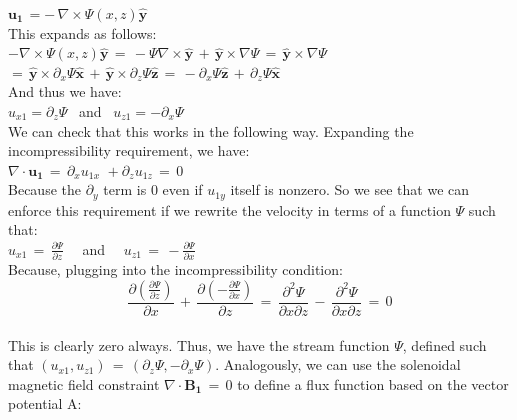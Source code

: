 \documentclass[letterpaper,12pt]{article}
\begin{document}
 $\mathbf{u_1} \, = - \, \nabla \times \Psi\left(x, z\right) \mathbf{\hat{y}}$ \\
 
 This expands as follows: \\
 
 $- \nabla \times \Psi\left(x, z\right) \mathbf{\hat{y}} \, = \, - \Psi\nabla \times \mathbf{\hat{y}} \, + \, \mathbf{\hat{y}} \times \nabla \Psi \, = \, \mathbf{\hat{y}} \times \nabla \Psi \,$ \\
 
 $= \, \mathbf{\hat{y}} \times \partial_x \Psi \mathbf{\hat{x}} \, + \, \mathbf{\hat{y}} \times \partial_z \Psi \mathbf{\hat{z}} \, = \, -\partial_x \Psi \mathbf{\hat{z}} \, + \, \partial_z \Psi \mathbf{\hat{x}}$ \\
 
 And thus we have: \\
 
$u_{x1} = \partial_z \Psi$ \, and \, $u_{z1} = -\partial_x \Psi$ \\

We can check that this works in the following way. Expanding the incompressibility requirement, we have: \\

$\nabla \cdot \mathbf{u_1} \, = \, \partial_x u_{1x} \, \, + \partial_z u_{1z} \, = \, 0$ \\

Because the $\partial_y$ term is 0 even if $u_{1y}$ itself is nonzero. So we see that we can enforce this requirement if we rewrite the velocity in terms of a function $\Psi$ such that:\\

$u_{x1} \, = \, \frac{\partial \Psi}{\partial z}$ \, \, and \, \, $u_{z1} \, = \, - \frac{\partial \Psi}{\partial x}$ \\

Because, plugging into the incompressibility condition: \\

\[\frac{\partial \left(\frac{\partial \Psi}{\partial z}\right)}{\partial x} \, + \, \frac{\partial \left(- \frac{\partial \Psi}{\partial x}\right)}{\partial z} \, = \, \frac{\partial^2 \Psi}{\partial x \partial z} \, - \, \frac{\partial^2 \Psi}{\partial x \partial z} \, = \, 0\] \\

This is clearly zero always. Thus, we have the stream function $\Psi$, defined such that $\left(u_{x1}, u_{z1}\right) \, = \, \left(\partial_z \Psi, -\partial_x \Psi\right)$. Analogously, we can use the solenoidal magnetic field constraint $\nabla \cdot \mathbf{B_1} \, = \, 0$ to define a flux function based on the vector potential A: \\
\end{document}
